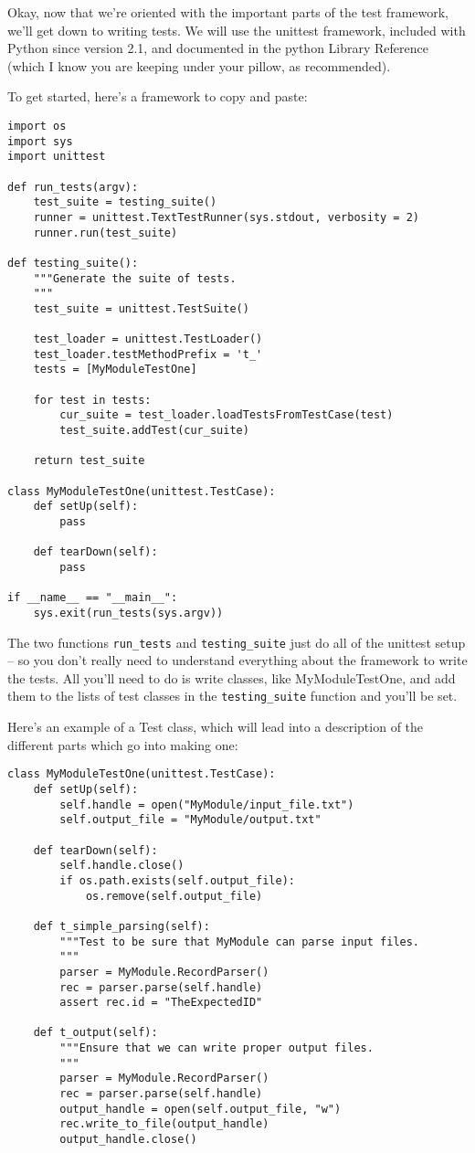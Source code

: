 \documentclass{article}
\begin{document}
Okay, now that we're oriented with the important parts of the test
framework, we'll get down to writing tests. We will use the unittest
framework, included with Python since version 2.1, and documented in the
python Library Reference (which I know you are keeping under your
pillow, as recommended).

To get started, here's a framework to copy and paste:

\begin{verbatim}
import os
import sys
import unittest

def run_tests(argv):
    test_suite = testing_suite()
    runner = unittest.TextTestRunner(sys.stdout, verbosity = 2)
    runner.run(test_suite)

def testing_suite():
    """Generate the suite of tests.
    """
    test_suite = unittest.TestSuite()

    test_loader = unittest.TestLoader()
    test_loader.testMethodPrefix = 't_'
    tests = [MyModuleTestOne]
    
    for test in tests:
        cur_suite = test_loader.loadTestsFromTestCase(test)
        test_suite.addTest(cur_suite)

    return test_suite

class MyModuleTestOne(unittest.TestCase):
    def setUp(self):
        pass

    def tearDown(self):
        pass

if __name__ == "__main__":
    sys.exit(run_tests(sys.argv))
\end{verbatim}

The two functions \verb|run_tests| and \verb|testing_suite| just do all
of the unittest setup -- so you don't really need to understand
everything about the framework to write the tests. All you'll need to do
is write classes, like MyModuleTestOne, and add them to the lists of
test classes in the \verb|testing_suite| function and you'll be set.


Here's an example of a Test class, which will lead into a description of
the different parts which go into making one:

\begin{verbatim}
class MyModuleTestOne(unittest.TestCase):
    def setUp(self):
        self.handle = open("MyModule/input_file.txt")
        self.output_file = "MyModule/output.txt"

    def tearDown(self):
        self.handle.close()
        if os.path.exists(self.output_file):
            os.remove(self.output_file)

    def t_simple_parsing(self):
        """Test to be sure that MyModule can parse input files.
        """
        parser = MyModule.RecordParser()
        rec = parser.parse(self.handle)
        assert rec.id = "TheExpectedID"

    def t_output(self):
        """Ensure that we can write proper output files.
        """
        parser = MyModule.RecordParser()
        rec = parser.parse(self.handle)
        output_handle = open(self.output_file, "w")
        rec.write_to_file(output_handle)
        output_handle.close()
\end{verbatim}
\end{document}
